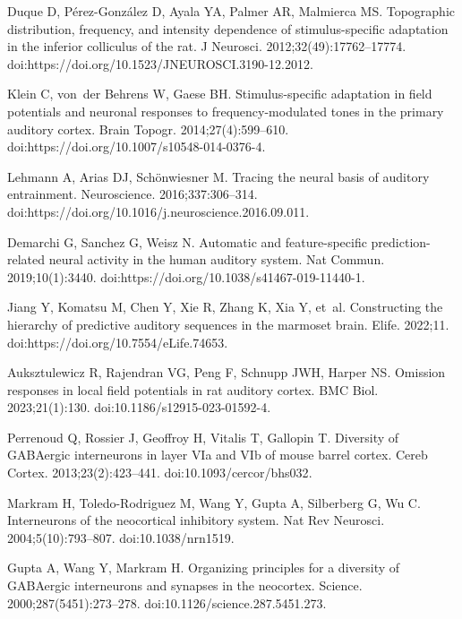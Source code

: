 \documentclass[10pt,letterpaper]{article}
\begin{document}
\begin{thebibliography}{100}
  Duque D, P{\'e}rez-Gonz{\'a}lez D, Ayala YA, Palmer AR, Malmierca MS.
  \newblock Topographic distribution, frequency, and intensity dependence of
    stimulus-specific adaptation in the inferior colliculus of the rat.
  \newblock J Neurosci. 2012;32(49):17762--17774.
  \newblock doi:{https://doi.org/10.1523/JNEUROSCI.3190-12.2012}.
  
  Klein C, von~der Behrens W, Gaese BH.
  \newblock Stimulus-specific adaptation in field potentials and neuronal
    responses to frequency-modulated tones in the primary auditory cortex.
  \newblock Brain Topogr. 2014;27(4):599--610.
  \newblock doi:{https://doi.org/10.1007/s10548-014-0376-4}.
  
  Lehmann A, Arias DJ, Sch{\"o}nwiesner M.
  \newblock Tracing the neural basis of auditory entrainment.
  \newblock Neuroscience. 2016;337:306--314.
  \newblock doi:{https://doi.org/10.1016/j.neuroscience.2016.09.011}.
  
  Demarchi G, Sanchez G, Weisz N.
  \newblock Automatic and feature-specific prediction-related neural activity in
    the human auditory system.
  \newblock Nat Commun. 2019;10(1):3440.
  \newblock doi:{https://doi.org/10.1038/s41467-019-11440-1}.
  
  Jiang Y, Komatsu M, Chen Y, Xie R, Zhang K, Xia Y, et~al.
  \newblock Constructing the hierarchy of predictive auditory sequences in the
    marmoset brain.
  \newblock Elife. 2022;11.
  \newblock doi:{https://doi.org/10.7554/eLife.74653}.
  
  Auksztulewicz R, Rajendran VG, Peng F, Schnupp JWH, Harper NS.
  \newblock Omission responses in local field potentials in rat auditory cortex.
  \newblock BMC Biol. 2023;21(1):130.
  \newblock doi:{10.1186/s12915-023-01592-4}.
  
  Perrenoud Q, Rossier J, Geoffroy H, Vitalis T, Gallopin T.
  \newblock Diversity of {GABAergic} interneurons in layer {VIa} and {VIb} of
    mouse barrel cortex.
  \newblock Cereb Cortex. 2013;23(2):423--441.
  \newblock doi:{10.1093/cercor/bhs032}.
  
  Markram H, Toledo-Rodriguez M, Wang Y, Gupta A, Silberberg G, Wu C.
  \newblock Interneurons of the neocortical inhibitory system.
  \newblock Nat Rev Neurosci. 2004;5(10):793--807.
  \newblock doi:{10.1038/nrn1519}.
  
  Gupta A, Wang Y, Markram H.
  \newblock Organizing principles for a diversity of {GABAergic} interneurons and
    synapses in the neocortex.
  \newblock Science. 2000;287(5451):273--278.
  \newblock doi:{10.1126/science.287.5451.273}.
  
  \end{thebibliography}
  
\end{document}
